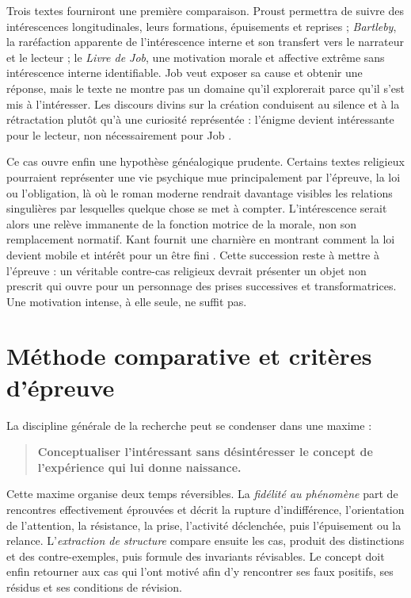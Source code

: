 \documentclass[11pt,a4paper]{article}
\begin{document}
Trois textes fourniront une première comparaison. Proust permettra de suivre
des intérescences longitudinales, leurs formations, épuisements et reprises ;
\emph{Bartleby}, la raréfaction apparente de l'intérescence interne et son
transfert vers le narrateur et le lecteur ; le \emph{Livre de Job}, une
motivation morale et affective extrême sans intérescence interne identifiable.
Job veut exposer sa cause et obtenir une réponse, mais le texte ne montre pas un
domaine qu'il explorerait parce qu'il s'est mis à l'intéresser. Les discours
divins sur la création conduisent au silence et à la rétractation plutôt qu'à
une curiosité représentée : l'énigme devient intéressante pour le lecteur, non
nécessairement pour Job \parencite{jps1985tanakh}.

Ce cas ouvre enfin une hypothèse généalogique prudente. Certains textes
religieux pourraient représenter une vie psychique mue principalement par
l'épreuve, la loi ou l'obligation, là où le roman moderne rendrait davantage
visibles les relations singulières par lesquelles quelque chose se met à
compter. L'intérescence serait alors une relève immanente de la fonction motrice
de la morale, non son remplacement normatif. Kant fournit une charnière en
montrant comment la loi devient mobile et intérêt pour un être fini
\parencite{kant1848moralepratique}. Cette succession reste à mettre à l'épreuve :
un véritable contre-cas religieux devrait présenter un objet non prescrit qui
ouvre pour un personnage des prises successives et transformatrices. Une
motivation intense, à elle seule, ne suffit pas.

\section{Méthode comparative et critères d'épreuve}

La discipline générale de la recherche peut se condenser dans une maxime :

\begin{quote}
\textbf{Conceptualiser l'intéressant sans désintéresser le concept de
l'expérience qui lui donne naissance.}
\end{quote}

Cette maxime organise deux temps réversibles. La \emph{fidélité au phénomène}
part de rencontres effectivement éprouvées et décrit la rupture d'indifférence,
l'orientation de l'attention, la résistance, la prise, l'activité déclenchée,
puis l'épuisement ou la relance. L'\emph{extraction de structure} compare ensuite
les cas, produit des distinctions et des contre-exemples, puis formule des
invariants révisables. Le concept doit enfin retourner aux cas qui l'ont motivé
afin d'y rencontrer ses faux positifs, ses résidus et ses conditions de révision.
\end{document}
